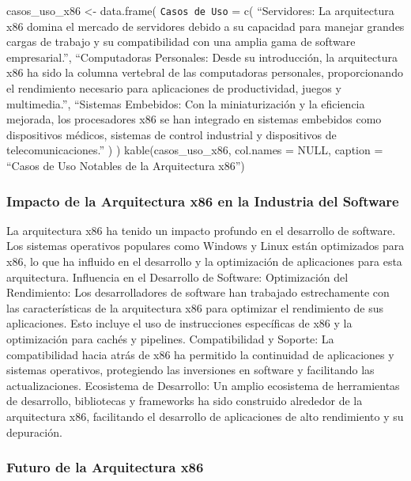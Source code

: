 \documentclass[12pt,twoside]{templates/unerthesis}
\begin{document}
casos\_uso\_x86 \textless{}- data.frame(
\texttt{Casos\ de\ Uso} = c(
``Servidores: La arquitectura x86 domina el mercado de servidores debido a su capacidad para manejar grandes cargas de trabajo y su compatibilidad con una amplia gama de software empresarial.'',
``Computadoras Personales: Desde su introducción, la arquitectura x86 ha sido la columna vertebral de las computadoras personales, proporcionando el rendimiento necesario para aplicaciones de productividad, juegos y multimedia.'',
``Sistemas Embebidos: Con la miniaturización y la eficiencia mejorada, los procesadores x86 se han integrado en sistemas embebidos como dispositivos médicos, sistemas de control industrial y dispositivos de telecomunicaciones.''
)
)
kable(casos\_uso\_x86, col.names = NULL, caption = ``Casos de Uso Notables de la Arquitectura x86'')

\hypertarget{impacto-de-la-arquitectura-x86-en-la-industria-del-software}{%
\subsubsection{Impacto de la Arquitectura x86 en la Industria del Software}\label{impacto-de-la-arquitectura-x86-en-la-industria-del-software}}

La arquitectura x86 ha tenido un impacto profundo en el desarrollo de software. Los sistemas operativos populares como Windows y Linux están optimizados para x86, lo que ha influido en el desarrollo y la optimización de aplicaciones para esta arquitectura.
Influencia en el Desarrollo de Software:
Optimización del Rendimiento: Los desarrolladores de software han trabajado estrechamente con las características de la arquitectura x86 para optimizar el rendimiento de sus aplicaciones. Esto incluye el uso de instrucciones específicas de x86 y la optimización para cachés y pipelines.
Compatibilidad y Soporte: La compatibilidad hacia atrás de x86 ha permitido la continuidad de aplicaciones y sistemas operativos, protegiendo las inversiones en software y facilitando las actualizaciones.
Ecosistema de Desarrollo: Un amplio ecosistema de herramientas de desarrollo, bibliotecas y frameworks ha sido construido alrededor de la arquitectura x86, facilitando el desarrollo de aplicaciones de alto rendimiento y su depuración.

\hypertarget{futuro-de-la-arquitectura-x86}{%
\subsubsection{Futuro de la Arquitectura x86}\label{futuro-de-la-arquitectura-x86}}
\end{document}
